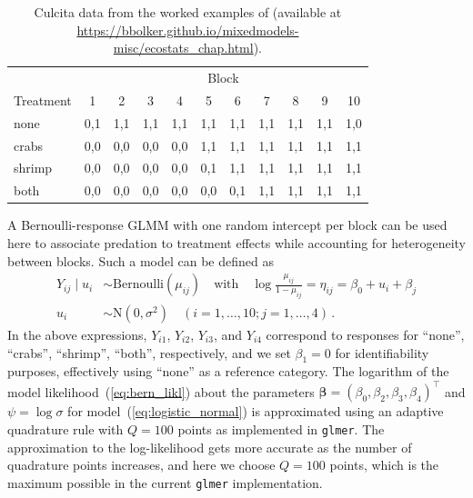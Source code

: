 \documentclass[11pt, a4paper]{article}
\newcommand*{\bb}{\boldsymbol}
\theoremstyle{example} \newtheorem{example}{Example}[section]
\theoremstyle{theorem} \newtheorem{theorem}{Theorem}[section]
\def\bbeta{\bb{\beta}}
\begin{document}
  \begin{table}[t]
    \caption{Culcita data \citep{mckeon+etal:2012} from the worked
      examples of \citet{bolker:2015} (available at
      \url{https://bbolker.github.io/mixedmodels-misc/ecostats\_chap.html}).}
    \label{tab:culcita}
    \centering
    \begin{tabular}{lllllllllll}
      \toprule
      & \multicolumn{10}{c}{Block} \\ \cmidrule{2-11}
      \multicolumn{1}{c}{Treatment} & \multicolumn{1}{c}{1} & \multicolumn{1}{c}{2} & \multicolumn{1}{c}{3} & \multicolumn{1}{c}{4} & \multicolumn{1}{c}{5} & \multicolumn{1}{c}{6} & \multicolumn{1}{c}{7} & \multicolumn{1}{c}{8} & \multicolumn{1}{c}{9} & \multicolumn{1}{c}{10} \\
      \midrule
      none & 0,1 & 1,1 & 1,1 & 1,1 & 1,1 & 1,1 & 1,1 & 1,1 & 1,1 & 1,0 \\
      crabs & 0,0 & 0,0 & 0,0 & 0,0 & 1,1 & 1,1 & 1,1 & 1,1 & 1,1 & 1,1 \\
      shrimp & 0,0 & 0,0 & 0,0 & 0,0 & 0,1 & 1,1 & 1,1 & 1,1 & 1,1 & 1,1 \\
      both & 0,0 & 0,0 & 0,0 & 0,0 & 0,0 & 0,1 & 1,1 & 1,1 & 1,1 & 1,1 \\
      \bottomrule
    \end{tabular}
\end{table}

A Bernoulli-response GLMM with one random intercept per block can be
used here to associate predation to treatment effects while
accounting for heterogeneity between blocks. Such a model can be
defined as
\begin{align}
  \label{eq:logistic_normal}
  Y_{ij} \mid u_i & \sim \text{Bernoulli}(\mu_{ij}) \quad  \text{with} \quad
  \log{\frac{\mu_{ij}}{1 - \mu_{ij}}} =  \eta_{ij} =  \beta_0 + u_i + \beta_{j} \\ 
  u_i & \sim \text{N}(0, \sigma^2) \quad (i = 1, \ldots, 10; j = 1, \ldots, 4)\,.
\end{align}
In the above expressions, $Y_{i1}$, $Y_{i2}$, $Y_{i3}$, and $Y_{i4}$
correspond to responses for ``none'', ``crabs'', ``shrimp'', ``both'',
respectively, and we set $\beta_1 = 0$ for identifiability purposes,
effectively using ``none'' as a reference category. The logarithm of the model likelihood~(\ref{eq:bern_likl}) about the parameters
$\bbeta = (\beta_0, \beta_2, \beta_3, \beta_4)^\top$ and
$\psi = \log\sigma$ for model~(\ref{eq:logistic_normal}) is
approximated using an adaptive quadrature rule with $Q = 100$ points
\citep[see, for example,][]{liu+pierce:1994, pinheiro+bates:1995} as
implemented in \texttt{glmer}.  The approximation to the log-likelihood
gets more accurate as the number of quadrature points increases, and
here we choose $Q = 100$ points, which is the maximum possible in the
current \texttt{glmer} implementation.
\end{document}
